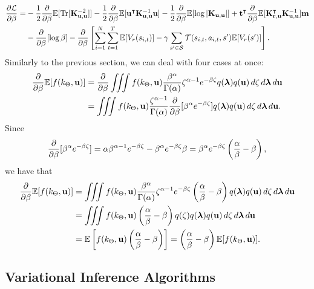 \documentclass{mprop}
\theoremstyle{definition}
\DeclareMathOperator{\Tr}{Tr}
\begin{document}
\[
  \begin{split}
    \frac{\partial\mathcal{L}}{\partial\beta} = &-
    \frac{1}{2}\db\mathbb{E}[\Tr[\Kuu^{-2}]] -
    \frac{1}{2}\db\mathbb{E}[\mathbf{u}^\intercal\Kuu^{-1}\mathbf{u}] -
    \frac{1}{2}\db\mathbb{E}[\log|\Kuu|] +
    \mathbf{t}^\intercal\db\mathbb{E}[\Kru^\intercal\Kuu^{-1}]\mathbf{m} \\
    &- \db[\log\beta] - \db \left[\sum_{i=1}^N \sum_{t=1}^T
      \mathbb{E}[V_r(s_{i,t})] - \gamma\sum_{s' \in \mathcal{S}}
      \mathcal{T}(s_{i,t}, a_{i,t}, s')\mathbb{E}[V_r(s')] \right].
  \end{split}
\]
Similarly to the previous section, we can deal with four cases at once:
\[
  \begin{split}
    \frac{\partial}{\partial\beta}\mathbb{E}[f(k_\Theta, \mathbf{u})] &= \frac{\partial}{\partial\beta} \iiint f(k_\Theta, \mathbf{u})
    \frac{\beta^\alpha}{\Gamma(\alpha)} \zeta^{\alpha - 1} e^{-\beta\zeta}
    q(\bm\lambda) q(\mathbf{u})\,d\zeta\,d\bm\lambda\,d\mathbf{u} \\
    &= \iiint f(k_\Theta, \mathbf{u}) \frac{\zeta^{\alpha - 1}}{\Gamma(\alpha)}
    \frac{\partial}{\partial\beta} [\beta^\alpha e^{-\beta\zeta}] q(\bm\lambda)
    q(\mathbf{u})\,d\zeta\,d\bm\lambda\,d\mathbf{u}.
  \end{split}
\]
Since
\[ \frac{\partial}{\partial\beta} [\beta^\alpha e^{-\beta\zeta}] = \alpha\beta^{\alpha - 1}e^{-\beta\zeta}
  - \beta^\alpha e^{-\beta\zeta}\beta = \beta^\alpha
  e^{-\beta\zeta} \left( \frac{\alpha}{\beta} - \beta \right), \]
we have that
\[
  \begin{split}
    \frac{\partial}{\partial\beta}\mathbb{E}[f(k_\Theta, \mathbf{u})] &= \iiint f(k_\Theta, \mathbf{u})
    \frac{\beta^\alpha}{\Gamma(\alpha)}\zeta^{\alpha - 1}e^{-\beta\zeta} \left(
      \frac{\alpha}{\beta} - \beta \right)  q(\bm\lambda)
    q(\mathbf{u})\,d\zeta\,d\bm\lambda\,d\mathbf{u} \\
    &= \iiint f(k_\Theta, \mathbf{u}) \left(\frac{\alpha}{\beta} - \beta \right)
    q(\zeta)q(\bm\lambda) q(\mathbf{u})\,d\zeta\,d\bm\lambda\,d\mathbf{u} \\
    &= \mathbb{E} \left[ f(k_\Theta, \mathbf{u}) \left( \frac{\alpha}{\beta} -
        \beta \right) \right] =  \left( \frac{\alpha}{\beta} - \beta \right)
    \mathbb{E} [f(k_\Theta, \mathbf{u})].
  \end{split}
\]

\subsection{Variational Inference Algorithms} \label{vi_algs}
\end{document}
